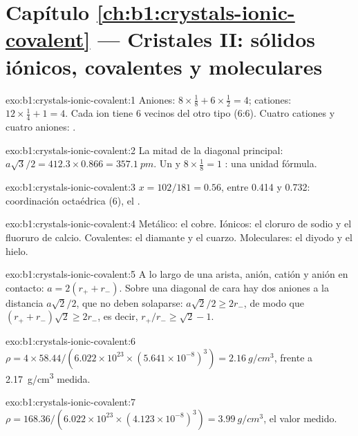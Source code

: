 \section*{Capítulo \ref{ch:b1:crystals-ionic-covalent} --- Cristales II: sólidos iónicos, covalentes y moleculares}

\begin{solution}{exo:b1:crystals-ionic-covalent:1}
Aniones: $8 \times \frac18 + 6 \times \frac12 = 4$; cationes: $12 \times
\frac14 + 1 = 4$. Cada ion tiene 6 vecinos del otro tipo (6:6). Cuatro
cationes y cuatro aniones: .
\end{solution}

\begin{solution}{exo:b1:crystals-ionic-covalent:2}
La mitad de la diagonal principal: $a\sqrt3/2 = 412.3 \times 0.866 = \qty{357.1}{pm}$.
Un  y $8 \times \frac18 = 1$ : una unidad fórmula.
\end{solution}

\begin{solution}{exo:b1:crystals-ionic-covalent:3}
$x = 102/181 = 0.56$, entre 0.414 y 0.732: coordinación octaédrica (6),
el .
\end{solution}

\begin{solution}{exo:b1:crystals-ionic-covalent:4}
Metálico: el cobre. Iónicos: el cloruro de sodio y el fluoruro de calcio.
Covalentes: el diamante y el cuarzo. Moleculares: el diyodo y el hielo.
\end{solution}

\begin{solution}{exo:b1:crystals-ionic-covalent:5}
A lo largo de una arista, anión, catión y anión en contacto:
$a = 2(r_+ + r_-)$. Sobre una diagonal de cara hay dos aniones a la
distancia $a\sqrt2/2$, que no deben solaparse: $a\sqrt2/2 \ge 2r_-$, de
modo que $(r_+ + r_-)\sqrt2 \ge 2r_-$, es decir,
$r_+/r_- \ge \sqrt2 - 1$.
\end{solution}

\begin{solution}{exo:b1:crystals-ionic-covalent:6}
$\rho = 4 \times 58.44/(6.022 \times 10^{23} \times (5.641 \times
10^{-8})^3) = \qty{2.16}{g/cm^3}$, frente a \qty{2.17}{g/cm^3} medida.
\end{solution}

\begin{solution}{exo:b1:crystals-ionic-covalent:7}
$\rho = 168.36/(6.022 \times 10^{23} \times (4.123 \times 10^{-8})^3) =
\qty{3.99}{g/cm^3}$, el valor medido.
\end{solution}


